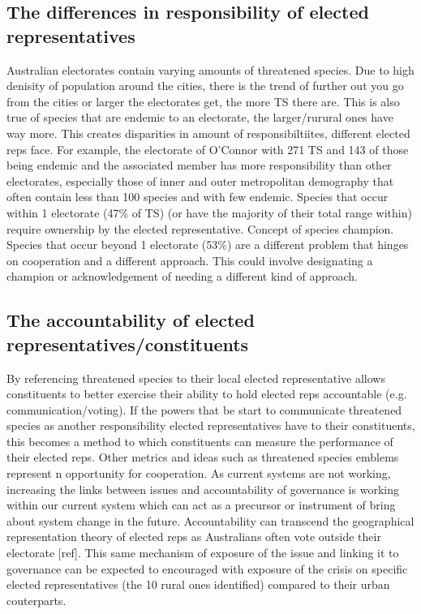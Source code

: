 \documentclass[a4paper,11pt]{article}
\begin{document}
\subsection{The differences in responsibility of elected representatives}

Australian electorates contain varying amounts of threatened species. Due to high denisity of population around the cities, there is the trend of further out you go from the cities or larger the electorates get, the more TS there are. This is also true of species that are endemic to an electorate, the larger/rurural ones have way more. This creates disparities in amount of responsibiltiites, different elected reps face. For example, the electorate of O'Connor with 271 TS and 143 of those being endemic and the associated member has more responsibility than other electorates, especially those of inner and outer metropolitan demography that often contain less than 100 species and with few endemic.
Species that occur within 1 electorate (47\% of TS) (or have the majority of their total range within) require ownership by the elected representative. Concept of species champion.
Species that occur beyond 1 electorate (53\%) are a different problem that hinges on cooperation and a different approach. This could involve designating a champion or acknowledgement of needing a different kind of approach.

\subsection{The accountability of elected representatives/constituents}

By referencing threatened species to their local elected representative allows constituents to better exercise their ability to hold elected reps accountable (e.g. communication/voting). If the powers that be start to communicate threatened species as another responsibility elected representatives have to their constituents, this becomes a method to which constituents can measure the performance of their elected reps. Other metrics and ideas such as threatened species emblems represent n opportunity for cooperation.
As current systems are not working, increasing the links between issues and accountability of governance is working within our current system which can act as a precursor or instrument of bring about system change in the future.
Accountability can transcend the geographical representation theory of elected reps as Australians often vote outside their electorate [ref].
This same mechanism of exposure of the issue and linking it to governance can be expected to encouraged with exposure of the crisis on specific elected representatives (the 10 rural ones identified) compared to their urban couterparts.
\end{document}

